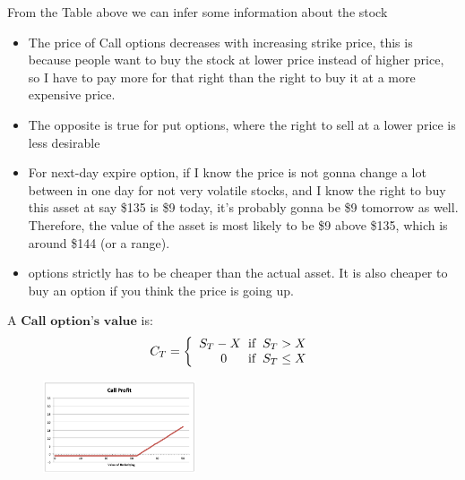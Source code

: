 \begin{multicols}{2}

From the Table above we can infer some information about the stock
\begin{itemize}
    \item The price of Call options decreases with increasing strike price, this is because people want to buy the stock at lower price instead of higher price, so I have to pay more for that right than the right to buy it at a more expensive price.
    \item The opposite is true for put options, where the right to sell at a lower price is less desirable
    \item For next-day expire option, if I know the price is not gonna change a lot between in one day for not very volatile stocks, and I know the right to buy this asset at say \$135 is \$9 today, it's probably gonna be \$9 tomorrow as well. Therefore, the value of the asset is most likely to be \$9 above \$135, which is around \$144 (or a range).
    \item options strictly has to be cheaper than the actual asset. It is also cheaper to buy an option if you think the price is going up.
\end{itemize}

A $\boxed{\textbf{Call option's value}}$ is:
\begin{gather*}
    C_T=\left\{
        \begin{array}{ll}
            \begin{split}
                S_T-X\hspace*{0.2cm}&\text{if}\hspace*{0.2cm}S_T>X\\
                0\hspace*{0.6cm}&\text{if}\hspace*{0.2cm}S_T\leq X\\
            \end{split}
        \end{array}
        \right.
\end{gather*}
\begin{figure}[H]
    \centering 
    \includegraphics[width =0.4\textwidth]{Figure/call.png}
\end{figure}


\end{multicols}
